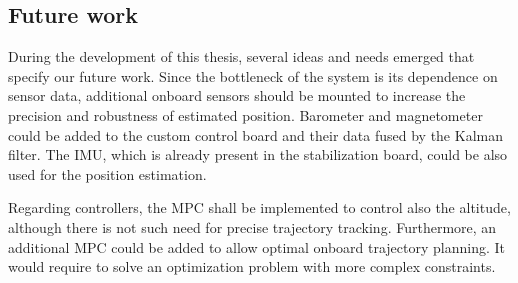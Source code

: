 \subsection{Future work}

During the development of this thesis, several ideas and needs emerged that specify our future work. Since the bottleneck of the system is its dependence on sensor data, additional onboard sensors should be mounted to increase the precision and robustness of estimated position. Barometer and magnetometer could be added to the custom control board and their data fused by the Kalman filter. The IMU, which is already present in the stabilization board, could be also used for the position estimation.

Regarding controllers, the MPC shall be implemented to control also the altitude, although there is not such need for precise trajectory tracking. Furthermore, an additional MPC could be added to allow optimal onboard trajectory planning. It would require to solve an optimization problem with more complex constraints. 
